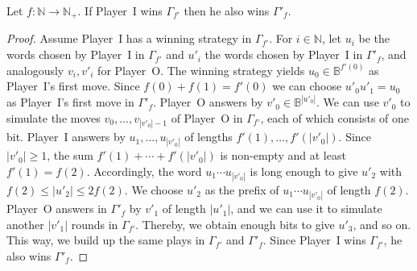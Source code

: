 \documentclass[fleqn,envcountsame]{LMCS}
\newcommand{\pI}{Player~I\xspace}
\newcommand{\pO}{Player~O\xspace}
\newcommand{\Gd}[1]{\ensuremath{\Gamma_{#1}}\xspace}
\newcommand{\Gp}[1]{\ensuremath{\Gamma'_{#1}}\xspace}
\newcommand{\Nat}{\ensuremath{\mathbb{N}}\xspace}
\newcommand{\Natp}{\ensuremath{\mathbb{N}_+}\xspace}
\newcommand{\B}{\ensuremath{\mathbb{B}}\xspace}
\begin{document}
\begin{prop}\label{prop:G_f_prime_G_prime_f}
Let $f:\Nat\to\Natp$. If \pI wins \Gd{f'} then he also wins \Gp{f}.
\end{prop}
\begin{proof}
Assume \pI has a winning strategy in \Gd{f'}. For $i\in\Nat$, let
$u_i$ be the words chosen by \pI in \Gd{f'} and $u'_i$ the words
chosen by \pI in \Gp{f}, and analogously $v_i,v'_i$ for \pO.
The winning strategy yields $u_0\in\B^{f'(0)}$ as \pI's first move.
Since $f(0)+f(1)=f'(0)$ we can choose $u'_0u'_1=u_0$ as \pI's first move
in \Gp{f}. \pO answers by $v'_0\in\B^{|u'_0|}$. We can use $v'_0$ to
simulate the moves $v_0,\ldots,v_{|v'_0|-1}$ of \pO in \Gd{f'},
each of which consists of one bit. \pI answers by
$u_1,\ldots,u_{|v'_0|}$ of lengths $f'(1),\ldots,f'(|v'_0|)$.
Since $|v'_0| \geq 1$, the sum $f'(1)+\cdots+f'(|v'_0|)$ is non-empty and
at least $f'(1)=f(2)$. Accordingly, the word $u_1\cdots u_{|v'_0|}$ is
long enough to give $u'_2$ with $f(2) \leq|u'_2| \leq 2f(2)$.
We choose $u'_2$ as the prefix of $u_1\cdots u_{|v'_0|}$ of length $f(2)$.
\pO answers in \Gp{f} by $v'_1$ of length $|u'_1|$, and we can use it to
simulate another $|v'_1|$ rounds in \Gd{f'}. Thereby, we obtain enough
bits to give $u'_3$, and so on. This way, we build up the same plays
in \Gd{f'} and \Gp{f}. Since \pI wins \Gd{f'}, he also wins \Gp{f}.
\end{proof}
\end{document}
